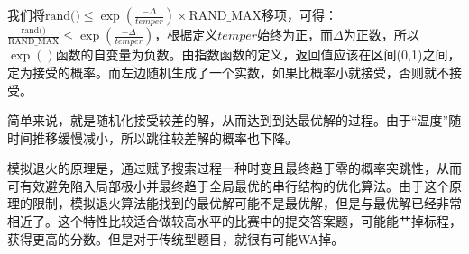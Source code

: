 	我们将$\textrm{rand()}\leq \exp(\frac{-\Delta}{temper})\times\textrm{RAND\_MAX}$移项，可得：
$\frac{\textrm{rand()}}{\textrm{RAND\_MAX}}\leq\exp(\frac{-\Delta}{temper})$，根据定义$temper$始终为正，而$\Delta$为正数，所以$\exp()$函数的自变量为负数。由指数函数的定义，返回值应该在区间(0,1)之间，定为接受的概率。而左边随机生成了一个实数，如果比概率小就接受，否则就不接受。

	简单来说，就是随机化接受较差的解，从而达到到达最优解的过程。由于“温度”随时间推移缓慢减小，所以跳往较差解的概率也下降。

	模拟退火的原理是，通过赋予搜索过程一种时变且最终趋于零的概率突跳性，从而可有效避免陷入局部极小并最终趋于全局最优的串行结构的优化算法。由于这个原理的限制，模拟退火算法能找到的最优解可能不是最优解，但是与最优解已经非常相近了。这个特性比较适合做较高水平的比赛中的提交答案题，可能能艹掉标程，获得更高的分数。但是对于传统型题目，就很有可能WA掉。

